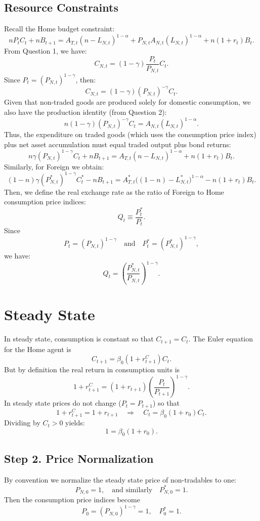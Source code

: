 \documentclass[a4paper,12pt]{article} %
\theoremstyle{nonitalic}
\begin{document}
\subsection*{Resource Constraints}
Recall the Home budget constraint:
\[
n P_t C_t + n B_{t+1} = A_{T,t}(n-L_{N,t})^{1-\alpha} + P_{N,t}A_{N,t}(L_{N,t})^{1-\alpha} + n(1+r_t)B_t.
\]
From Question 1, we have:
\[
C_{N,t} = (1-\gamma) \frac{P_t}{P_{N,t}} C_t.
\]
Since \(P_t=(P_{N,t})^{1-\gamma}\), then:
\[
C_{N,t} = (1-\gamma)(P_{N,t})^{-\gamma}C_t.
\]
Given that non-traded goods are produced solely for domestic consumption, we also have the production identity (from Question 2):
\[
n (1-\gamma)(P_{N,t})^{-\gamma}C_t = A_{N,t}(L_{N,t})^{1-\alpha}.
\]
Thus, the expenditure on traded goods (which uses the consumption price index) plus net asset accumulation must equal traded output plus bond returns:
\[
\boxed{n\gamma (P_{N,t})^{1-\gamma}C_t + n B_{t+1} = A_{T,t}(n-L_{N,t})^{1-\alpha} + n(1+r_t)B_t.}
\]
Similarly, for Foreign we obtain:
\[
\boxed{(1-n)\gamma (P^*_{N,t})^{1-\gamma}C^*_t - n B_{t+1} = A^*_{T,t}\big((1-n)-L^*_{N,t}\big)^{1-\alpha} - n(1+r_t)B_t.}
\]
Then, we define the real exchange rate as the ratio of Foreign to Home consumption price indices:
\[
Q_t \equiv \frac{P^*_t}{P_t}.
\]
Since
\[
P_t = (P_{N,t})^{1-\gamma} \quad \text{and} \quad P^*_t = (P^*_{N,t})^{1-\gamma},
\]
we have:
\[
\boxed{Q_t = \left(\frac{P^*_{N,t}}{P_{N,t}}\right)^{1-\gamma}.}
\]

\section{Steady State}

In steady state, consumption is constant so that $C_{t+1}=C_t$. The Euler equation for the Home agent is
\[
C_{t+1} = \beta_0(1+r_{t+1}^C) C_t.
\]
But by definition the real return in consumption units is
\[
1+r_{t+1}^C = (1+r_{t+1})\left(\frac{P_t}{P_{t+1}}\right)^{1-\gamma}.
\]
In steady state prices do not change ($P_t=P_{t+1}$) so that
\[
1+r_{t+1}^C = 1+r_{t+1}\quad\Rightarrow\quad C_t = \beta_0(1+r_0)C_t.
\]
Dividing by $C_t>0$ yields:
\[
1=\beta_0(1+r_0).
\]

\subsection*{Step 2. Price Normalization}
By convention we normalize the steady state price of non-tradables to one:
\[
P_{N,0}=1,\quad \text{and similarly}\quad P^*_{N,0}=1.
\]
Then the consumption price indices become
\[
P_0=(P_{N,0})^{1-\gamma}=1,\quad P^*_0=1.
\]
\end{document}
